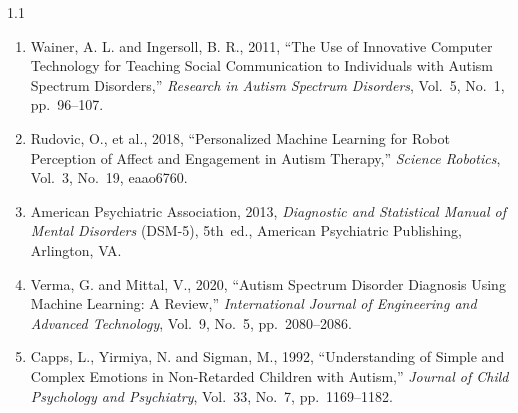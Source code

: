 \documentclass[12pt,a4paper,oneside]{report}
\begin{document}
\begin{spacing}{1.1}
\begin{enumerate}
  \item Wainer, A. L. and Ingersoll, B. R., 2011, ``The Use of Innovative Computer Technology for Teaching Social Communication to Individuals with Autism Spectrum Disorders,'' \textit{Research in Autism Spectrum Disorders}, Vol.~5, No.~1, pp.~96--107.

  \item Rudovic, O., et al., 2018, ``Personalized Machine Learning for Robot Perception of Affect and Engagement in Autism Therapy,'' \textit{Science Robotics}, Vol.~3, No.~19, eaao6760.

  \item American Psychiatric Association, 2013, \textit{Diagnostic and Statistical Manual of Mental Disorders} (DSM-5), 5th~ed., American Psychiatric Publishing, Arlington, VA.

  \item Verma, G. and Mittal, V., 2020, ``Autism Spectrum Disorder Diagnosis Using Machine Learning: A Review,'' \textit{International Journal of Engineering and Advanced Technology}, Vol.~9, No.~5, pp.~2080--2086.

  \item Capps, L., Yirmiya, N. and Sigman, M., 1992, ``Understanding of Simple and Complex Emotions in Non-Retarded Children with Autism,'' \textit{Journal of Child Psychology and Psychiatry}, Vol.~33, No.~7, pp.~1169--1182.

\end{enumerate}
\end{spacing}
\end{document}
